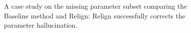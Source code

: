 \begin{figure}[!h]
    \centering
    \vspace{-15pt}
    \caption{
    A case study on the missing parameter subset comparing the Baseline method and Relign: Relign successfully corrects the parameter hallucination.}
    \label{fig:exp_case}
\end{figure}
